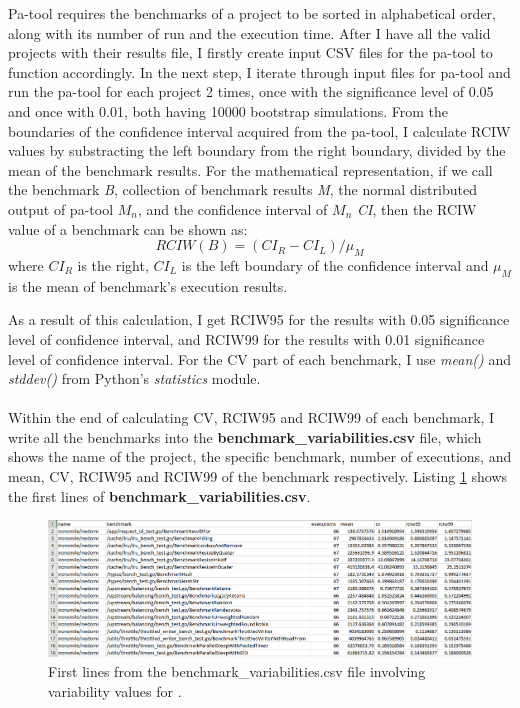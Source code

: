 \documentclass{seal_thesis}
\begin{document}
Pa-tool requires the benchmarks of a project to be sorted in alphabetical order, along with its number of run and the execution time. After I have all the valid projects with their results file, I firstly create input CSV files for the pa-tool to function accordingly. In the next step, I iterate through input files for pa-tool and run the pa-tool for each project 2 times, once with the significance level of 0.05 and once with 0.01, both having 10000 bootstrap simulations. From the boundaries of the confidence interval acquired from the pa-tool, I calculate RCIW values by substracting the left boundary from the right boundary, divided by the mean of the benchmark results. For the mathematical representation, if we call the benchmark \textit{B}, collection of benchmark results \textit{M}, the normal distributed output of pa-tool $M_{n}$, and the confidence interval of $M_{n}$ \textit{CI}, then the RCIW value of a benchmark can be shown as:
\[ RCIW(B) = ({CI_{R}} - {CI_{L}}) / \mu _{M} \]
where $CI_{R}$ is the right, $CI_{L}$ is the left boundary of the confidence interval and $\mu _{M}$ is the mean of benchmark's execution results.

\noindent As a result of this calculation, I get RCIW95 for the results with 0.05 significance level of confidence interval, and RCIW99 for the results with 0.01 significance level of confidence interval. For the CV part of each benchmark, I use \textit{mean()} and \textit{stddev()} from Python's \textit{statistics} module\cite{pythonsta}.\\
\\
Within the end of calculating CV, RCIW95 and RCIW99 of each benchmark, I write all the benchmarks into the \textbf{benchmark\_variabilities.csv} file, which shows the name of the project, the specific benchmark, number of executions, and mean, CV, RCIW95 and RCIW99 of the benchmark respectively. Listing \ref{fig:finalcsv} shows the first lines of \textbf{benchmark\_variabilities.csv}.

\begin{figure}[H]
	\centering
	\includegraphics[width=\linewidth]{finalcsvexample}
	\caption{First lines from the benchmark\_variabilities.csv file involving variability values for \cite{ironsmile/nedomi}.}
	\label{fig:finalcsv}
\end{figure}
\end{document}
